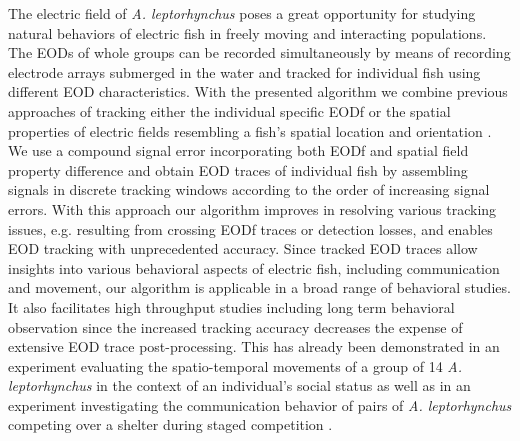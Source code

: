 \documentclass[11pt,pdftex]{article}
\newcommand{\figurecaptions}{\pagestyle{empty}\clearpage\processdelayedfloats\renewcommand{\figureplace}{}}}%
\newcommand{\figurecaptions}{}%
\newcommand{\lepto}{\textit{A. leptorhynchus}}
\begin{document}
The electric field of \lepto{} poses a great opportunity for studying natural behaviors of electric fish in freely moving and interacting populations. The EODs of whole groups can be recorded simultaneously by means of recording electrode arrays submerged in the water and tracked for individual fish using different EOD characteristics. With the presented algorithm we combine previous approaches of tracking either the individual specific EODf \citep{Henninger2020} or the spatial properties of electric fields resembling a fish's spatial location and orientation \citep{Madhav2018}. We use a compound signal error incorporating both EODf and spatial field property difference and obtain EOD traces of individual fish by assembling signals in discrete tracking windows according to the order of increasing signal errors. With this approach our algorithm improves in resolving various tracking issues, e.g. resulting from crossing EODf traces or detection losses, and enables EOD tracking with unprecedented accuracy. Since tracked EOD traces allow insights into various behavioral aspects of electric fish, including communication and movement, our algorithm is applicable in a broad range of behavioral studies. It also facilitates high throughput studies including long term behavioral observation since the increased tracking accuracy decreases the expense of extensive EOD trace post-processing. This has already been demonstrated in an experiment evaluating the spatio-temporal movements of a group of 14 \lepto{} in the context of an individual's social status \citep{Raab2019} as well as in an experiment investigating the communication behavior of pairs of \lepto{} competing over a shelter during staged competition \citep{Raab2021}.
%



\end{document}
